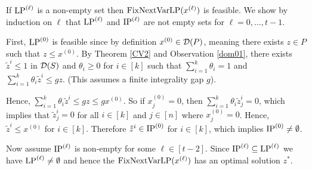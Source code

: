 If $\operatorname{LP}^{(\ell)}$ is a non-empty set then $\operatorname{{{FixNextVarLP}}}(x^{(\ell)})$ is feasible. We show by induction on $\ell$ that $\operatorname{LP}^{(\ell)}$ and $\operatorname{IP}^{(\ell)}$ are not empty sets for $\ell=0,\ldots,t-1$. 

First, $\operatorname{LP}^{(0)}$ is feasible since by definition $x^{(0)}\in \operatorname{\mathcal{D}}(P)$, meaning there exists $z\in P$ such that $z\leq x^{(0)}$. By Theorem \ref{CV2} and Observation \ref{dom01}, there exists $\tilde{z}^i\leq 1$ in $\operatorname{\mathcal{D}}(S)$ and $\theta_i\geq 0$ for $i\in [k]$ such that $\sum_{i=1}^{k} \theta_i = 1$ and $\sum_{i=1}^{k}\theta_i \tilde{z}^i \leq gz$. (This assumes a finite integrality gap $g$).

 Hence, $\sum_{i=1}^{k}\theta_i \tilde{z}^i \leq gz\leq gx^{(0)}$. So if $x^{(0)}_j=0$, then $ \sum_{i=1}^{k}\theta_i \tilde{z}_j^i =0$, which implies that $\tilde{z}^i_j=0$ for all $i\in [k]$ and $j\in [n]$ where $x^{(0)}_j=0$. Hence, $\tilde{z}^i\leq x^{(0)}$ for $i\in [k]$. Therefore $\tilde{z}^i\in \operatorname{IP}^{(0)}$ for $i\in [k]$, which implies $\operatorname{IP}^{(0)}\neq \emptyset$.

Now assume $\operatorname{IP}^{(\ell)}$ is non-empty for some $\ell \in [t-2]$. Since $\operatorname{IP}^{(\ell)}\subseteq\operatorname{LP}^{(\ell)}$ we have $\operatorname{LP}^{(\ell)}\neq \emptyset$ and hence the $\operatorname{{{FixNextVarLP}}}(x^{(\ell)})$ has an optimal solution $z^*$.

